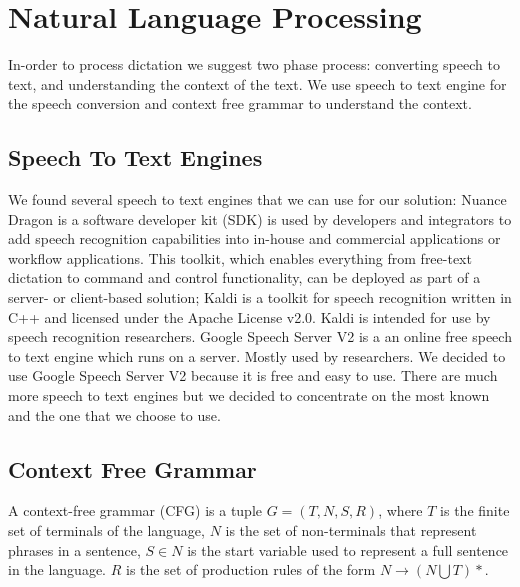 \section{Natural Language Processing}
In-order to process dictation we suggest two phase process: converting speech to text, and understanding the context of the text. We use speech to text engine for the speech conversion and context free grammar to understand the  context.
\subsection{Speech To Text Engines}
We found several speech to text engines that we can use for our solution: Nuance Dragon \cite{Nuance14} is a software developer kit (SDK) is used by developers and integrators to add speech recognition capabilities into in-house and commercial applications or workflow applications. This toolkit, which enables everything from free-text dictation to command and control functionality, can be deployed as part of a server- or client-based solution; Kaldi \cite{Povey_ASRU2011} is a toolkit for speech recognition written in C++ and licensed under the Apache License v2.0. Kaldi is intended for use by speech recognition researchers. Google Speech Server V2 \cite{google15} is a an online free speech to text engine which runs on a server. Mostly used by researchers. We decided to use Google Speech Server V2 because it is free and easy to use. There are much more speech to text engines but we decided to concentrate on the most known and the one that we choose to use.
\subsection{Context Free Grammar}
A context-free grammar (CFG) is a tuple $ G=(T,N,S,R) $, where $ T $ is the finite set of  terminals of the language, $ N $ is the set of non-terminals that represent phrases in a sentence, $ S \in N $ is the start variable used to represent a full sentence in the language. $ R $ is the set of production rules of the form $ N \rightarrow (N \bigcup T)* $.
